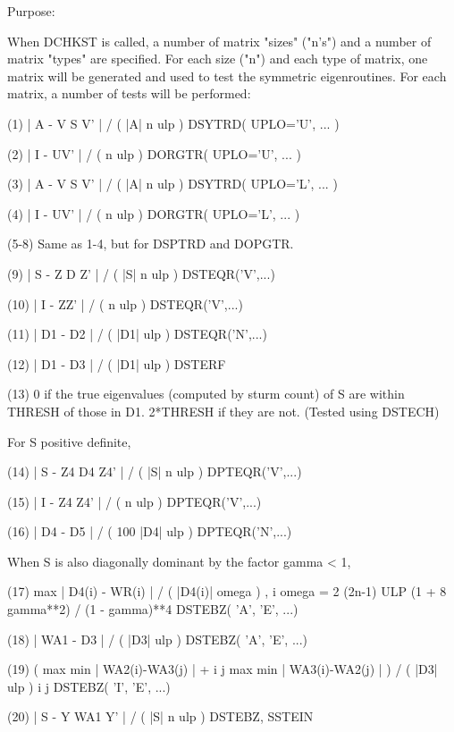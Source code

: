 \begin{DoxyParagraph}{Purpose\+: }
\begin{DoxyVerb}
 When DCHKST is called, a number of matrix "sizes" ("n's") and a
 number of matrix "types" are specified.  For each size ("n")
 and each type of matrix, one matrix will be generated and used
 to test the symmetric eigenroutines.  For each matrix, a number
 of tests will be performed:

 (1)     | A - V S V' | / ( |A| n ulp ) DSYTRD( UPLO='U', ... )

 (2)     | I - UV' | / ( n ulp )        DORGTR( UPLO='U', ... )

 (3)     | A - V S V' | / ( |A| n ulp ) DSYTRD( UPLO='L', ... )

 (4)     | I - UV' | / ( n ulp )        DORGTR( UPLO='L', ... )

 (5-8)   Same as 1-4, but for DSPTRD and DOPGTR.

 (9)     | S - Z D Z' | / ( |S| n ulp ) DSTEQR('V',...)

 (10)    | I - ZZ' | / ( n ulp )        DSTEQR('V',...)

 (11)    | D1 - D2 | / ( |D1| ulp )        DSTEQR('N',...)

 (12)    | D1 - D3 | / ( |D1| ulp )        DSTERF

 (13)    0 if the true eigenvalues (computed by sturm count)
         of S are within THRESH of
         those in D1.  2*THRESH if they are not.  (Tested using
         DSTECH)

 For S positive definite,

 (14)    | S - Z4 D4 Z4' | / ( |S| n ulp ) DPTEQR('V',...)

 (15)    | I - Z4 Z4' | / ( n ulp )        DPTEQR('V',...)

 (16)    | D4 - D5 | / ( 100 |D4| ulp )       DPTEQR('N',...)

 When S is also diagonally dominant by the factor gamma < 1,

 (17)    max | D4(i) - WR(i) | / ( |D4(i)| omega ) ,
          i
         omega = 2 (2n-1) ULP (1 + 8 gamma**2) / (1 - gamma)**4
                                              DSTEBZ( 'A', 'E', ...)

 (18)    | WA1 - D3 | / ( |D3| ulp )          DSTEBZ( 'A', 'E', ...)

 (19)    ( max { min | WA2(i)-WA3(j) | } +
            i     j
           max { min | WA3(i)-WA2(j) | } ) / ( |D3| ulp )
            i     j
                                              DSTEBZ( 'I', 'E', ...)

 (20)    | S - Y WA1 Y' | / ( |S| n ulp )  DSTEBZ, SSTEIN


\end{DoxyVerb}
\end{DoxyParagraph}
